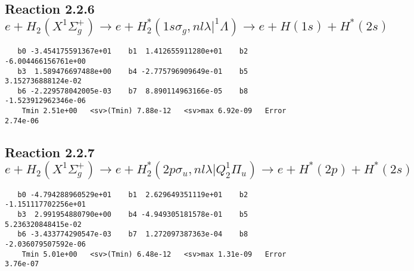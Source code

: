\documentclass[12pt]{article}
\begin{document}
\newpage
\subsection{
Reaction 2.2.6 $e + H_2(X^1\Sigma_g^+) \rightarrow e + H_2^*(1s\sigma_g,nl\lambda|^1\Lambda) \rightarrow e +  H(1s) + H^*(2s)$}














\begin{small}\begin{verbatim}
   b0 -3.454175591367e+01    b1  1.412655911280e+01    b2 -6.004466156761e+00
   b3  1.589476697488e+00    b4 -2.775796909649e-01    b5  3.152736888124e-02
   b6 -2.229578042005e-03    b7  8.890114963166e-05    b8 -1.523912962346e-06
    Tmin 2.51e+00   <sv>(Tmin) 7.88e-12   <sv>max 6.92e-09   Error 2.74e-06
\end{verbatim}\end{small}

\newpage
\subsection{
Reaction 2.2.7 $ e+H_2(X^1\Sigma_g^+) \rightarrow e + H_2^*(2p\sigma_u, nl\lambda|Q_2^1\Pi_u) \rightarrow e + H^*(2p) + H^*(2s)$}














\begin{small}\begin{verbatim}
   b0 -4.794288960529e+01    b1  2.629649351119e+01    b2 -1.151117702256e+01
   b3  2.991954880790e+00    b4 -4.949305181578e-01    b5  5.236320848415e-02
   b6 -3.433774290547e-03    b7  1.272097387363e-04    b8 -2.036079507592e-06
    Tmin 5.01e+00   <sv>(Tmin) 6.48e-12   <sv>max 1.31e-09   Error 3.76e-07
\end{verbatim}\end{small}
\end{document}
